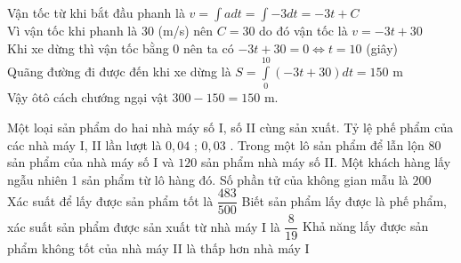 \begin{ex}
{\begin{itemchoice}
			Vận tốc từ khi bắt đầu phanh là $v=\displaystyle\int a dt=\displaystyle\int -3dt=-3t+C$\\
			Vì vận tốc khi phanh là $30$ (m/s) nên $C=30$ do đó vận tốc là $v=-3t+30$\\
			Khi xe dừng thì vận tốc bằng $0$ nên ta có $-3t+30=0\Leftrightarrow t=10$ (giây)\\
			Quãng đường đi được đến khi xe dừng là $S=\displaystyle\int\limits_0^{10}{\left(-3t+30\right)dt}=150$ m\\
			Vậy ôtô cách chướng ngại vật $300-150=150$ m.
		\end{itemchoice}
	}
\end{ex}

\begin{ex}%
	Một loại sản phẩm do hai nhà máy số I, số II cùng sản xuất. Tỷ lệ phế phẩm của các nhà máy I, II lần lượt là $0,04$ ; $0,03$ . Trong một lô sản phẩm để lẫn lộn $80$ sản phẩm của nhà máy số I và $120$ sản phẩm nhà máy số II. Một khách hàng lấy ngẫu nhiên 1 sản phẩm từ lô hàng đó.
	\choiceTF
	{\True Số phần tử của không gian mẫu là $200$}
	{\True Xác suất để lấy được sản phẩm tốt là $\dfrac{483}{500}$}
	{Biết sản phẩm lấy được là phế phẩm, xác suất sản phẩm được sản xuất từ nhà máy I là $\dfrac{8}{19}$}
	{Khả năng lấy được sản phẩm không tốt của nhà máy II là thấp hơn nhà máy I}
\end{ex}


